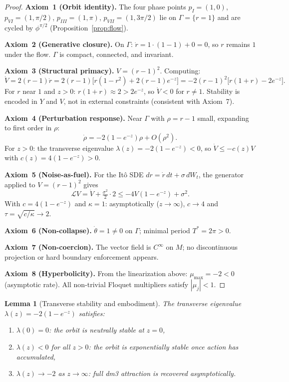 \documentclass[12pt, oneside]{book}
\theoremstyle{plain}
\newtheorem{lemma}[theorem]{Lemma}
\theoremstyle{definition}
\theoremstyle{remark}
\newcommand{\Orb}{\Gamma}
\newcommand{\cL}{\mathcal{L}}
\begin{document}
\begin{proof}
\textbf{Axiom~1 (Orbit identity).}
The four phase points $p_I=(1,0)$, $p_{VI}=(1,\pi/2)$,
$p_{III}=(1,\pi)$, $p_{VII}=(1,3\pi/2)$ lie on $\Orb=\{r=1\}$
and are cycled by $\phi^{\pi/2}$ (Proposition~\ref{prop:flow}).

\textbf{Axiom~2 (Generative closure).}
On $\Orb$: $\dot r = 1\cdot(1-1)+0=0$, so $r$ remains $1$
under the flow. $\Orb$ is compact, connected, and invariant.

\textbf{Axiom~3 (Structural primacy).}
$V=(r-1)^2$. Computing:
\[
  \dot V = 2(r-1)\dot r
  = 2(r-1)\bigl[r(1-r^2)+2(r-1)e^{-z}\bigr]
  = -2(r-1)^2\bigl[r(1+r)-2e^{-z}\bigr].
\]
For $r$ near $1$ and $z>0$: $r(1+r)\approx 2>2e^{-z}$,
so $\dot V<0$ for $r\ne 1$. Stability is encoded in $Y$ and $V$,
not in external constraints (consistent with Axiom~7).

\textbf{Axiom~4 (Perturbation response).}
Near $\Orb$ with $\rho=r-1$ small, expanding to first order in
$\rho$:
\[
  \dot\rho = -2(1-e^{-z})\rho + O(\rho^2).
\]
For $z>0$: the transverse eigenvalue
$\lambda(z)=-2(1-e^{-z})<0$, so $\dot V\le -c(z)V$ with
$c(z)=4(1-e^{-z})>0$.

\textbf{Axiom~5 (Noise-as-fuel).}
For the It\^{o} SDE $dr=\dot r\,dt+\sigma\,dW_t$, the generator
applied to $V=(r-1)^2$ gives
\[
  \cL V = \dot V + \tfrac{\sigma^2}{2}\cdot 2
  \le -4V(1-e^{-z}) + \sigma^2.
\]
With $c=4(1-e^{-z})$ and $\kappa=1$: asymptotically ($z\to\infty$),
$c\to 4$ and $\tau=\sqrt{c/\kappa}\to 2$.

\textbf{Axiom~6 (Non-collapse).}
$\dot\theta=1\ne 0$ on $\Orb$; minimal period $T^*=2\pi>0$.

\textbf{Axiom~7 (Non-coercion).}
The vector field is $C^\infty$ on $M$; no discontinuous
projection or hard boundary enforcement appears.

\textbf{Axiom~8 (Hyperbolicity).}
From the linearization above: $\mu_{\max}=-2<0$ (asymptotic
rate). All non-trivial Floquet multipliers satisfy $|\mu_j|<1$.
\end{proof}

\begin{lemma}[Transverse stability and embodiment]\label{lem:transverse}
The transverse eigenvalue $\lambda(z)=-2(1-e^{-z})$ satisfies:
\begin{enumerate}[label=\textup{(\roman*)}]
  \item $\lambda(0)=0$: the orbit is neutrally stable at $z=0$,
  \item $\lambda(z)<0$ for all $z>0$: the orbit is exponentially
        stable once action has accumulated,
  \item $\lambda(z)\to -2$ as $z\to\infty$: full dm3 attraction
        is recovered asymptotically.
\end{enumerate}
\end{lemma}
\end{document}

